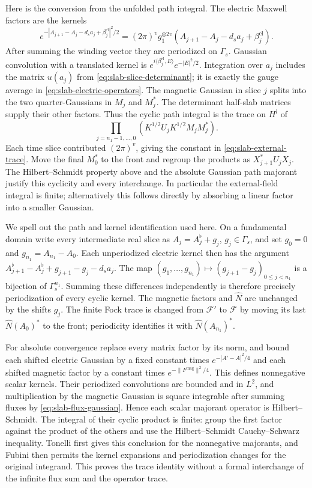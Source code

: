Here is the conversion from the unfolded path integral. The electric
Maxwell factors are the kernels
\[
 e^{-|A_{j+1}-A_j-d_sa_j+\beta_j^{\mathrm{el}}|^2/2}
       =(2\pi)^v g_1^{\otimes 2v}
                       (A_{j+1}-A_j-d_sa_j+\beta_j^{\mathrm{el}}).
\]
After summing the winding vector they are periodized on $\Gamma_s$.
Gaussian convolution with a translated kernel is
$e^{i\langle\beta_j^{\mathrm{el}},E\rangle}e^{-|E|^2/2}$.
Integration over $a_j$ includes the matrix $u(a_j)$ from
\eqref{eq:slab-slice-determinant}; it is exactly the gauge average in
\eqref{eq:slab-electric-operators}. The magnetic Gaussian in slice
$j$ splits into the two quarter-Gaussians in $M_j$ and $M_j^*$.
The determinant half-slab matrices supply their other factors.
Thus the cyclic path integral is the trace on $H^l$ of
\[
 \prod_{j=n_1-1,\ldots,0}
       (K^{1/2}U_jK^{1/2}M_jM_j^*).
\]
Each time slice contributed $(2\pi)^v$, giving the constant in
\eqref{eq:slab-external-trace}. Move the final $M_0^*$ to the front
and regroup the products as $X_{j+1}^*U_jX_j$. The
Hilbert--Schmidt property above and the absolute Gaussian path
majorant justify this cyclicity and every interchange. In particular
the external-field integral is finite; alternatively this follows
directly by absorbing a linear factor into a smaller Gaussian.

We spell out the path and kernel identification used here. On a
fundamental domain write every intermediate real slice as
$A_j=A_j^\flat+g_j$, $g_j\in\Gamma_s$, and set $g_0=0$ and
$g_{n_1}=A_{n_1}-A_0$. Each unperiodized electric kernel then has
the argument
$A_{j+1}^\flat-A_j^\flat+g_{j+1}-g_j-d_sa_j$.
The map $(g_1,\ldots,g_{n_1})\mapsto
(g_{j+1}-g_j)_{0\le j<n_1}$ is a bijection of $\Gamma_s^{n_1}$.
Summing these differences independently is therefore precisely
periodization of every cyclic kernel. The magnetic factors and
$\widehat N$ are unchanged by the shifts $g_j$. The finite Fock trace
is changed from $\mathcal F'$ to $\mathcal F$ by moving its last
$\widehat N(A_0)^*$ to the front; periodicity identifies it with
$\widehat N(A_{n_1})^*$.

For absolute convergence replace every matrix factor by its norm,
and bound each shifted electric Gaussian by a fixed constant times
$e^{-|A'-A|^2/4}$ and each shifted magnetic factor by a constant
times $e^{-\|F^{\mathrm{mag}}\|^2/4}$. This defines nonnegative
scalar kernels. Their periodized convolutions are bounded and in
$L^2$, and multiplication by the magnetic Gaussian is square
integrable after summing fluxes by \eqref{eq:slab-flux-gaussian}.
Hence each scalar majorant operator is Hilbert--Schmidt. The
integral of their cyclic product is finite: group the first factor
against the product of the others and use the Hilbert--Schmidt
Cauchy--Schwarz inequality. Tonelli first gives this conclusion
for the nonnegative majorants, and Fubini then permits the kernel
expansions and periodization changes for the original integrand.
This proves the trace identity without a formal interchange of
the infinite flux sum and the operator trace.

